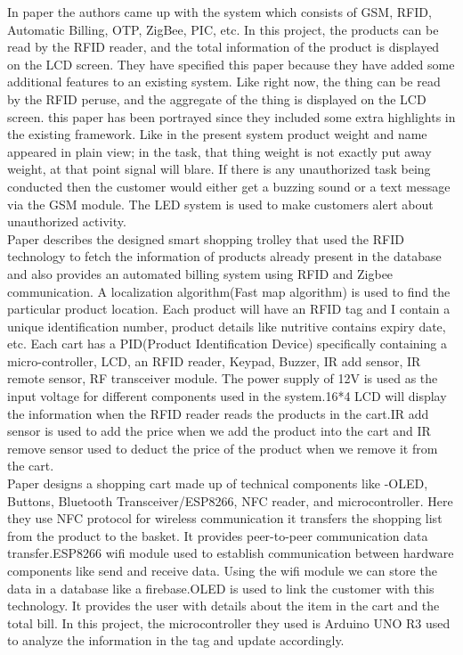 \documentclass[conference]{IEEEtran}
\begin{document}
In paper\cite{b13} the authors came up with the system which consists of GSM, RFID, Automatic Billing, OTP, ZigBee, PIC, etc. In this project, the products can be read by the RFID reader, and the total information of the product is displayed on the LCD screen. They have specified this paper because they have added some additional features to an existing system. Like right now, the thing can be read by the RFID peruse, and the aggregate of the thing is displayed on the LCD screen. this paper has been portrayed since they included some extra highlights in the existing framework.
Like in the present system product weight and name appeared in plain view; in the task, that thing weight is not exactly put away weight, at that point signal will blare. If there is any unauthorized task being conducted then the customer would either get a buzzing sound or a text message via the GSM module. The LED system is used to make customers alert about unauthorized activity.\\

Paper\cite{b14} describes the designed smart shopping trolley that used the RFID technology to fetch the information of products already present in the database and also provides an automated billing system using RFID and Zigbee communication. A localization algorithm(Fast map algorithm) is used to find the particular product location. Each product will have an RFID tag and I contain a unique identification number, product details like nutritive contains expiry date, etc. Each cart has a PID(Product Identification Device) specifically containing a micro-controller, LCD, an RFID reader, Keypad, Buzzer, IR add sensor, IR remote sensor, RF transceiver module. The power supply of 12V is used as the input voltage for different components used in the system.16*4 LCD will display the information when the RFID reader reads the products in the cart.IR add sensor is used to add the price when we add the product into the cart and IR remove sensor used to deduct the price of the product when we remove it from the cart.\\


Paper\cite{b15} designs a shopping cart made up of technical components like -OLED, Buttons, Bluetooth Transceiver/ESP8266, NFC reader, and microcontroller. Here they use NFC protocol for wireless communication it transfers the shopping list from the product to the basket. It provides peer-to-peer communication data transfer.ESP8266 wifi module used to establish communication between hardware components like send and receive data. Using the wifi module we can store the data in a database like a firebase.OLED is used to link the customer with this technology. It provides the user with details about the item in the cart and the total bill. In this project, the microcontroller they used is Arduino UNO R3 used to analyze the information in the tag and update accordingly.\\
\end{document}
